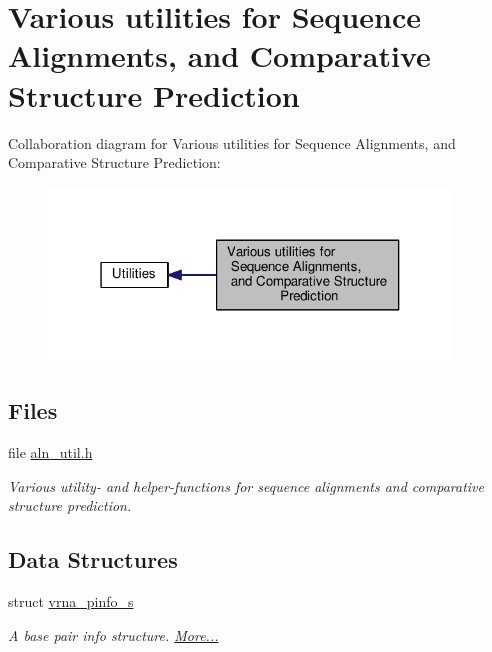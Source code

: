 \hypertarget{group__aln__utils}{\section{Various utilities for Sequence Alignments, and Comparative Structure Prediction}
\label{group__aln__utils}
}
Collaboration diagram for Various utilities for Sequence Alignments, and Comparative Structure Prediction\-:
\nopagebreak
\begin{figure}[H]
\begin{center}
\leavevmode
\includegraphics[width=304pt]{group__aln__utils}
\end{center}
\end{figure}
\subsection*{Files}
\begin{DoxyCompactItemize}
\item 
file \hyperlink{aln__util_8h}{aln\-\_\-util.\-h}
\begin{DoxyCompactList}\small\item\em Various utility-\/ and helper-\/functions for sequence alignments and comparative structure prediction. \end{DoxyCompactList}\end{DoxyCompactItemize}
\subsection*{Data Structures}
\begin{DoxyCompactItemize}
\item 
struct \hyperlink{group__aln__utils_structvrna__pinfo__s}{vrna\-\_\-pinfo\-\_\-s}
\begin{DoxyCompactList}\small\item\em A base pair info structure.  \hyperlink{group__aln__utils_structvrna__pinfo__s}{More...}\end{DoxyCompactList}\end{DoxyCompactItemize}
